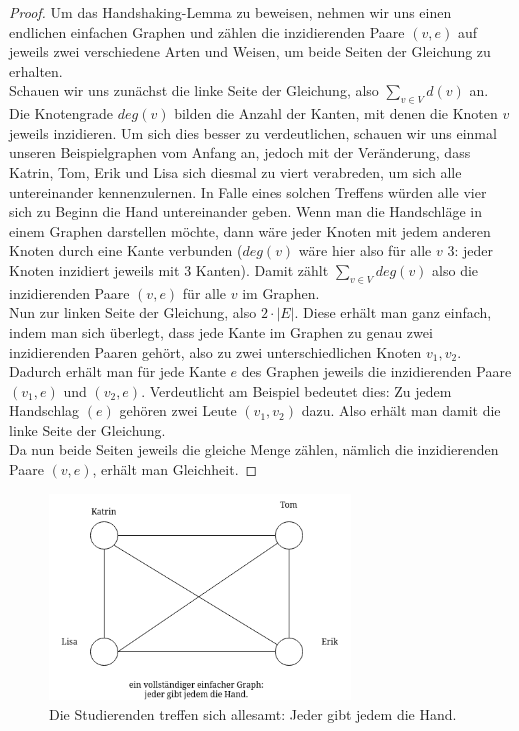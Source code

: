 \documentclass{article}
\theoremstyle{plain}
\begin{document}
\bigskip
\begin{proof}
	Um das Handshaking-Lemma zu beweisen, nehmen wir uns einen endlichen einfachen Graphen und zählen die inzidierenden Paare $(v, e)$ auf jeweils zwei verschiedene Arten und Weisen, um beide Seiten der Gleichung zu erhalten.\\
	Schauen wir uns zunächst die linke Seite der Gleichung, also $\sum_{v \in V}d(v)$ an. Die Knotengrade $deg(v)$ bilden die Anzahl der Kanten, mit denen die Knoten $v$ jeweils inzidieren. Um sich dies besser zu verdeutlichen, schauen wir uns einmal unseren Beispielgraphen vom Anfang an, jedoch mit der Veränderung, dass Katrin, Tom, Erik und Lisa sich diesmal zu viert verabreden, um sich alle untereinander kennenzulernen. In Falle eines solchen Treffens würden alle vier sich zu Beginn die Hand untereinander geben. Wenn man die Handschläge in einem Graphen darstellen möchte, dann wäre jeder Knoten mit jedem anderen Knoten durch eine Kante verbunden ($deg(v)$ wäre hier also für alle $v$ $3$: jeder Knoten inzidiert jeweils mit $3$ Kanten). Damit zählt $\sum_{v \in V}deg(v)$ also die inzidierenden Paare $(v, e)$ für alle $v$ im Graphen.\\
	Nun zur linken Seite der Gleichung, also $2 \cdot |E|$. Diese erhält man ganz einfach, indem man sich überlegt, dass jede Kante im Graphen zu genau zwei inzidierenden Paaren gehört, also zu zwei unterschiedlichen Knoten $v_1, v_2$. Dadurch erhält man für jede Kante $e$ des Graphen jeweils die inzidierenden Paare $(v_1, e)$ und $(v_2, e)$. Verdeutlicht am Beispiel bedeutet dies: Zu jedem Handschlag $(e)$ gehören zwei Leute $(v_1, v_2)$ dazu. Also erhält man damit die linke Seite der Gleichung.\\
	Da nun beide Seiten jeweils die gleiche Menge zählen, nämlich die inzidierenden Paare $(v, e)$, erhält man Gleichheit.
\end{proof}
\bigskip
\begin{figure}[!htp]
    \centering
    \includegraphics[width=8cm]{vortrag_schriftlich/images/three_h_lemma.drawio.png}
    \caption{Die  Studierenden treffen sich allesamt: Jeder gibt jedem die Hand.}
    \label{fig:fig3}
\end{figure}
\end{document}
